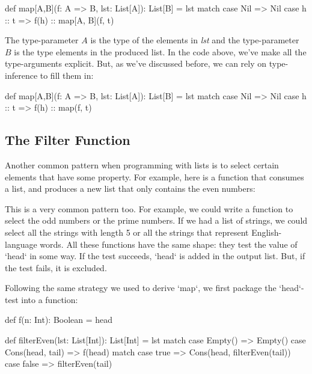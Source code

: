 \documentclass{book}
\begin{document}
\begin{scalacode}
def map[A,B](f: A => B, lst: List[A]): List[B] = lst match {
  case Nil => Nil
  case h :: t => f(h) :: map[A, B](f, t)
}
\end{scalacode}

The type-parameter $A$ is the type of the elements in 
\emph{lst} and the type-parameter $B$ is the type elements in the produced list.
In the code above, we've make all the type-arguments explicit. But, as we've
discussed before, we can rely on type-inference to fill them in:

\begin{scalacode}
def map[A,B](f: A => B, lst: List[A]): List[B] = lst match {
  case Nil => Nil
  case h :: t => f(h) :: map(f, t)
}
\end{scalacode}

\subsection{The Filter Function}

Another common pattern when programming with lists is to select certain elements
that have some property. For example, here is a function that consumes a list,
and produces a new list that only contains the even numbers:


This is a very common pattern too. For example, we could write a function to
select the odd numbers or the prime numbers. If we had a list of strings, we
could select all the strings with length 5 or all the strings that represent
English-language words. All these functions have the same shape: they test
the value of `head` in some way. If the test succeeds, `head` is added in
the output list. But, if the test fails, it is excluded.

Following the same strategy we used to derive `map`, we first package
the `head`-test into a function:

\begin{scalacode}
def f(n: Int): Boolean = head %

def filterEven(lst: List[Int]): List[Int] = lst match {
  case Empty() => Empty()
  case Cons(head, tail) =>
    f(head) match {
      case true => Cons(head, filterEven(tail))
      case false => filterEven(tail)
    }
}
\end{scalacode}
\end{document}

